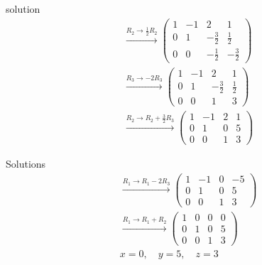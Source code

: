 \documentclass{beamer}
\begin{document}
\begin{frame}{solution}
\begin{align}
&\xrightarrow{R_2 \to \frac{1}{2} R_2}
\left(
\begin{array}{ccc|c}
1 & -1 & 2 & 1 \\
0 & 1 & -\frac{3}{2} & \frac{1}{2} \\
0 & 0 & -\frac{1}{2} & -\frac{3}{2}
\end{array}
\right) \\
&\xrightarrow{R_3 \to -2 R_3}
\left(
\begin{array}{ccc|c}
1 & -1 & 2 & 1 \\
0 & 1 & -\frac{3}{2} & \frac{1}{2} \\
0 & 0 & 1 & 3
\end{array}
\right) \\
&\xrightarrow{R_2 \to R_2 + \frac{3}{2} R_3}
\left(
\begin{array}{ccc|c}
1 & -1 & 2 & 1 \\
0 & 1 & 0 & 5 \\
0 & 0 & 1 & 3
\end{array}
\right) 
\end{align}
\end{frame}
\begin{frame}{Solutions}
\begin{align}
 &\xrightarrow{R_1 \to R_1 - 2 R_3}
\left(
\begin{array}{ccc|c}
1 & -1 & 0 & -5 \\
0 & 1 & 0 & 5 \\
0 & 0 & 1 & 3
\end{array}
\right) \\
&\xrightarrow{R_1 \to R_1 + R_2}
\left(
\begin{array}{ccc|c}
1 & 0 & 0 & 0 \\
0 & 1 & 0 & 5 \\
0 & 0 & 1 & 3
\end{array}
\right) \\
&x = 0, \quad y = 5, \quad z = 3
\end{align}
\end{frame}
\end{document}
